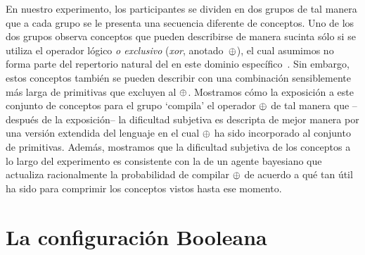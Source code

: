 
En nuestro experimento, los participantes se dividen en dos grupos de tal manera que a cada grupo se le presenta una secuencia diferente de conceptos. Uno de los dos grupos observa conceptos que pueden describirse de manera sucinta sólo si se utiliza el operador lógico {\em o exclusivo} ({\em xor}, anotado~$\oplus$), el cual asumimos no forma parte del repertorio natural del \lot en este dominio específico~\cite{piantadosi2016logical}. Sin embargo, estos conceptos también se pueden describir con una combinación sensiblemente más larga de primitivas que excluyen al $\oplus$. Mostramos cómo la exposición a este conjunto de conceptos para el grupo `compila' el operador $\oplus$ de tal manera que --después de la exposición-- la dificultad subjetiva es descripta de mejor manera por una versión extendida del lenguaje en el cual $\oplus$ ha sido incorporado al conjunto de primitivas. Además, mostramos que la dificultad subjetiva de los conceptos a lo largo del experimento es consistente con la de un agente bayesiano que actualiza racionalmente la probabilidad de compilar $\oplus$ de acuerdo a qué tan útil ha sido para comprimir los conceptos vistos hasta ese momento.

\section{La configuración Booleana}

